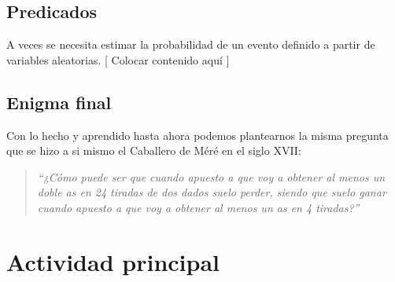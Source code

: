 \documentclass{article}
\begin{document}
\subsection{Predicados}

A veces se necesita estimar la probabilidad de un evento definido a partir de variables aleatorias. [ Colocar contenido aquí ]

\subsection{Enigma final}

Con lo hecho y aprendido hasta ahora podemos plantearnos la misma pregunta que se hizo a si mismo el Caballero de Méré en el siglo XVII: 

\begin{quotation}
\em``¿Cómo puede ser que cuando apuesto a que voy a obtener al menos un doble as en 24 tiradas de dos dados suelo perder, siendo que suelo ganar cuando apuesto a que voy a obtener al menos un as en 4 tiradas?''
\end{quotation}


\section{Actividad principal}
\end{document}
